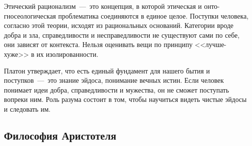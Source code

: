 
Этический рационализм~---~это концепция, в которой этическая и онто-гносеологическая проблематика соединяются в единое целое. Поступки человека, согласно этой теории, исходят из рациональных оснований. Категории вроде добра и зла, справедливости и несправедливости не существуют сами по себе, они зависят от контекста. Нельзя оценивать вещи по принципу <<лучше-хуже>> в их изолированности. 

Платон утверждает, что есть единый фундамент для нашего бытия и поступков~---~это знание эйдоса, понимание вечных истин. Если человек понимает идеи добра, справедливости и мужества, он не сможет поступать вопреки ним. Роль разума состоит в том, чтобы научиться видеть чистые эйдосы и следовать им.

\subsection{Философия Аристотеля}

